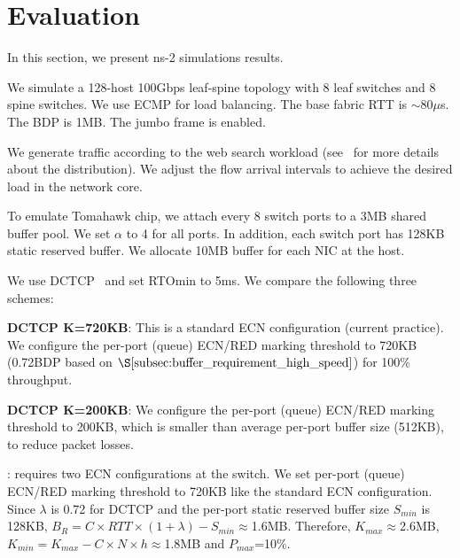 \section{Evaluation}\label{sec:evaluation}
In this section, we present ns-2 simulations results.

\vspace{-1mm}
We simulate a 128-host 100Gbps leaf-spine topology with 8 leaf switches and 8 spine switches. We use ECMP for load balancing. The base fabric RTT is $\sim$80$\mu$s. The BDP is 1MB. The jumbo frame is enabled.

\vspace{-1mm}
We generate traffic according to the web search workload (see~\cite{dctcp} for more details about the distribution). We adjust the flow arrival intervals to achieve the desired load in the network core.

\vspace{-1mm}
To emulate Tomahawk chip, we attach every 8 switch ports to a 3MB shared buffer pool. We set $\alpha$ to 4 for all ports. In addition, each switch port has 128KB static reserved buffer. We allocate 10MB buffer for each NIC at the host.

\vspace{-1mm}
We use DCTCP~\cite{dctcp} and set RTOmin to 5ms. We compare the following three schemes:
\begin{icompact}
\vspace{-1mm}
\item \textbf{DCTCP K=720KB}: This is a standard ECN configuration (current practice). We configure the per-port (queue) ECN/RED marking threshold to 720KB (0.72BDP based on $\S\ref{subsec:buffer_requirement_high_speed}$) for 100\% throughput.
\vspace{-1mm}
\item \textbf{DCTCP K=200KB}: We configure the per-port (queue) ECN/RED marking threshold to 200KB, which is smaller than average per-port buffer size (512KB), to reduce packet losses.
\vspace{-1mm}
\item \textbf{\sys}: \sys requires two ECN configurations at the switch. We set per-port (queue) ECN/RED marking threshold to 720KB like the standard ECN configuration. Since $\lambda$ is 0.72 for DCTCP and the per-port static reserved buffer size $S_{min}$ is 128KB, $B_R=C\times RTT\times(1+\lambda)-S_{min}\approx$1.6MB. Therefore, $K_{max}\approx$2.6MB, $K_{min}=K_{max}-C\times N\times h\approx$1.8MB and $P_{max}$=10\%.
\end{icompact}

